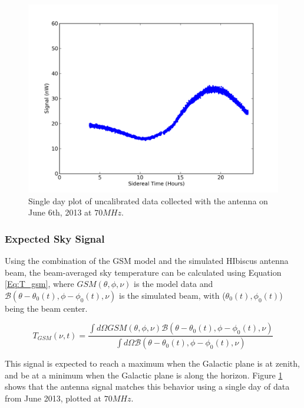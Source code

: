 \begin{figure}[htb]
\begin{center}
\includegraphics[width=0.9\linewidth]{Data_analysis/figures/June_06_time_series_uncal_70mhz.png}
\caption{Single day plot of uncalibrated data collected with the antenna on June 6th, 2013 at $70 MHz$.}
\label{Fig:raw_time_series}
\end{center}
\end{figure}

\subsubsection{Expected Sky Signal}

Using the combination of the GSM model and the simulated HIbiscus antenna beam, the beam-averaged sky temperature can be calculated using Equation \ref{Eq:T_gsm}, where $GSM (\theta, \phi, \nu)$ is the model data and $\mathcal{B} (\theta - \theta_0(t), \phi - \phi_0(t),\nu)$ is the simulated beam, with ($\theta_0 (t),\phi_0 (t)$) being the beam center. 


\begin{equation} \label{Eq:T_gsm}
T_{GSM} (\nu,t) = \frac{ \int d \Omega GSM (\theta, \phi, \nu) \mathcal{B} (\theta - \theta_0(t), \phi - \phi_0(t),\nu)}{\int d\Omega \mathcal{B} (\theta -\theta_0(t), \phi - \phi_0(t), \nu)}
\end{equation}

This signal is expected to reach a maximum when the Galactic plane is at zenith, and be at a minimum when the Galactic plane is along the horizon. Figure \ref{Fig:raw_time_series} shows that the antenna signal matches this behavior using a single day of data from June 2013, plotted at $70 MHz$. 


